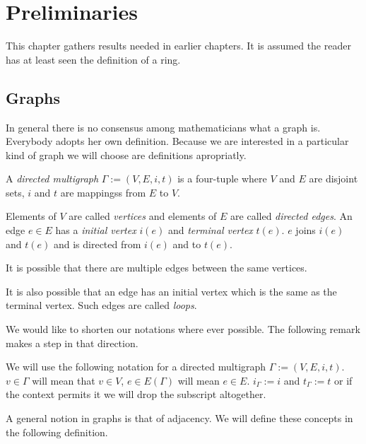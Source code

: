 \chapter{Preliminaries}

This chapter gathers results needed in earlier chapters. It is assumed the
reader has at least seen the definition of a ring.

\section{Graphs}

In general there is no consensus among mathematicians what a graph is. Everybody
adopts her own definition. Because we are interested in a particular kind of
graph we will choose are definitions apropriatly.

\begin{definition}
	A \emph{directed multigraph} $\Gamma:=(V,E,i,t)$ is a four-tuple where
	$V$ and $E$ are disjoint sets, $i$ and $t$ are mappingss from $E$ to
	$V$.
	
	Elements of $V$ are called \emph{vertices} and elements of $E$ are
	called \emph{directed edges}. An edge $e\in E$ has a \emph{initial vertex} $i(e)$
	and \emph{terminal vertex} $t(e)$. $e$ joins $i(e)$ and $t(e)$ and is
	directed from $i(e)$ and to $t(e)$.
\end{definition}

\begin{remark}		
	It is possible that there are multiple edges between the same vertices. 
	
	It is also possible that an edge has an initial	vertex which is the same
	as the terminal vertex. Such edges are called \emph{loops}.
\end{remark}

We would like to shorten our notations where ever possible. The following remark
makes a step in that direction.

\begin{remark}
	We will use the following notation for a directed multigraph $\Gamma :=
	(V,E,i,t)$. $v\in\Gamma$ will mean that $v\in V$, $e\in E(\Gamma)$ will
	mean $e\in E$. $i_{\Gamma} := i$ and $t_{\Gamma} := t$ or if the context
	permits it we will drop the subscript altogether. 
\end{remark}

A general notion in graphs is that of adjacency. We will define these concepts
in the following definition.

